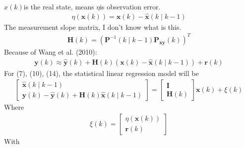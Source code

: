\documentclass[dvipdfmx]{jsarticle}
\begin{document}
$x(k)$is the real state, means $\eta$is observation error.
\begin{equation}\label{Func.}\begin{aligned}
    \eta(\mathbf{x}(k))=\mathbf{x}(k)-\widehat{\mathbf{x}}(k \mid k-1)
\end{aligned}\end{equation}
The measurement slope matrix, I don't know what is this.
\begin{equation}\label{Func.}\begin{aligned}
    \mathbf{H}(k)=\left(\mathbf{P}^{-1}(k \mid k-1) \mathbf{P}_{\mathbf{x y}}(k)\right)^{T}
\end{aligned}\end{equation}
Because of Wang et al. (2010):
\begin{equation}\label{Func.}\begin{aligned}
    \mathbf{y}(k) \approx \widehat{\mathbf{y}}(k)+\mathbf{H}(k)(\mathbf{x}(k)-\widehat{\mathbf{x}}(k \mid k-1))+\mathbf{r}(k)
\end{aligned}\end{equation}
For (7), (10), (14), the statistical linear regression model will be
\begin{equation}\label{Func.}\begin{aligned}
    \left[\begin{array}{c}
        \widehat{\mathbf{x}}(k \mid k-1) \\
        \mathbf{y}(k)-\widehat{\mathbf{y}}(k)+\mathbf{H}(k) \widehat{\mathbf{x}}(k \mid k-1)
        \end{array}\right]=\left[\begin{array}{c}
        \mathbf{I} \\
        \mathbf{H}(k)
        \end{array}\right] \mathbf{x}(k)+\xi(k)
\end{aligned}\end{equation}
Where
\begin{equation}\label{Func.}\nonumber\begin{aligned}
    \xi(k)=\left[\begin{array}{c}
        \eta(\mathbf{x}(k)) \\
        \mathbf{r}(k)
        \end{array}\right]
\end{aligned}\end{equation}
With
\end{document}
